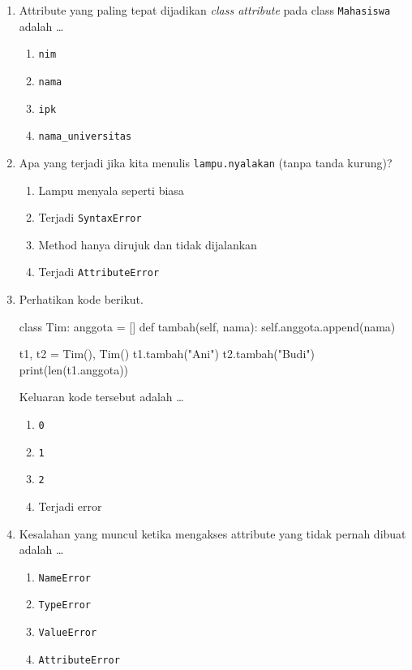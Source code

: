 \begin{enumerate}
  \item Attribute yang paling tepat dijadikan \emph{class attribute} pada class \texttt{Mahasiswa} adalah \ldots
  \begin{enumerate}[label=\alph*.,itemsep=0pt]
    \item \texttt{nim}
    \item \texttt{nama}
    \item \texttt{ipk}
    \item \texttt{nama\_universitas}
  \end{enumerate}

  \item Apa yang terjadi jika kita menulis \texttt{lampu.nyalakan} (tanpa tanda kurung)?
  \begin{enumerate}[label=\alph*.,itemsep=0pt]
    \item Lampu menyala seperti biasa
    \item Terjadi \texttt{SyntaxError}
    \item Method hanya dirujuk dan tidak dijalankan
    \item Terjadi \texttt{AttributeError}
  \end{enumerate}

  \item Perhatikan kode berikut.
\begin{kode}[Soal 7]
class Tim:
    anggota = []
    def tambah(self, nama):
        self.anggota.append(nama)

t1, t2 = Tim(), Tim()
t1.tambah("Ani")
t2.tambah("Budi")
print(len(t1.anggota))
\end{kode}
  Keluaran kode tersebut adalah \ldots
  \begin{enumerate}[label=\alph*.,itemsep=0pt]
    \item \texttt{0}
    \item \texttt{1}
    \item \texttt{2}
    \item Terjadi error
  \end{enumerate}

  \item Kesalahan yang muncul ketika mengakses attribute yang tidak pernah dibuat adalah \ldots
  \begin{enumerate}[label=\alph*.,itemsep=0pt]
    \item \texttt{NameError}
    \item \texttt{TypeError}
    \item \texttt{ValueError}
    \item \texttt{AttributeError}
  \end{enumerate}


\end{enumerate}
